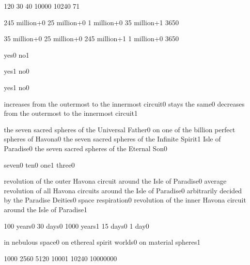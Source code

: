 {12}{0}
{3}{0}
{4}{0}
{1000}{0}
{1024}{0}
{7}{1}
\qstop

{245 million+}{0}
{25 million+}{0}
{1 million+}{0}
{35 million+}{1}
{365}{0}
\qstop

{35 million+}{0}
{25 million+}{0}
{245 million+}{1}
{1 million+}{0}
{365}{0}
\qstop

{yes}{0}
{no}{1}
\qstop

{yes}{1}
{no}{0}
\qstop

{yes}{1}
{no}{0}
\qstop

{increases from the outermost to the innermost circuit}{0}
{stays the same}{0}
{decreases from the outermost to the innermost circuit}{1}
\qstop

{the seven sacred spheres of the Universal Father}{0}
{on one of the billion perfect spheres of Havona}{0}
{the seven sacred spheres of the Infinite Spirit}{1}
{Isle of Paradise}{0}
{the seven sacred spheres of the Eternal Son}{0}
\qstop

{seven}{0}
{ten}{0}
{one}{1}
{three}{0}
\qstop

{revolution of the outer Havona circuit around the Isle of Paradise}{0}
{average revolution of all Havona circuits around the Isle of Paradise}{0}
{arbitrarily decided by the Paradise Deities}{0}
{space respiration}{0}
{revolution of the inner Havona circuit around the Isle of Paradise}{1}
\qstop


{100 years}{0}
{30 days}{0}
{1000 years}{1}
{15 days}{0}
{1 day}{0}
\qstop

{in nebulous space}{0}
{on ethereal spirit worlds}{0}
{on material spheres}{1}
\qstop

{100}{0}
{256}{0}
{512}{0}
{1000}{1}
{1024}{0}
{1000000}{0}
\qstop


